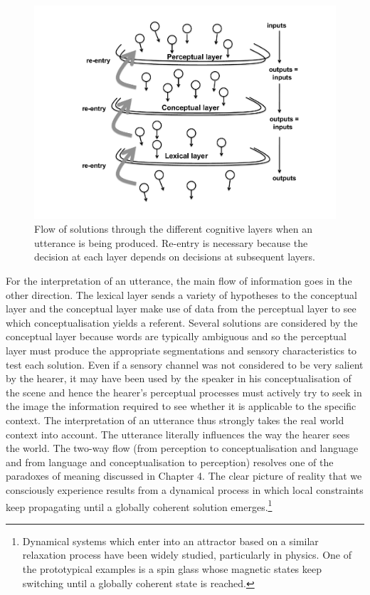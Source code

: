 \begin{figure}[htbp]
  \centerline{\includegraphics[width=.50\textwidth]{chap7/figs/sieve3.pdf}}
\caption{\label{sieve3}Flow of solutions through 
the different cognitive layers when an utterance is being produced.
Re-entry is necessary because the decision at each layer depends on
decisions at subsequent layers.} 
\end{figure}

For the interpretation of an utterance, the main 
flow of information goes in the other direction. The
lexical layer sends a variety of hypotheses to 
the conceptual layer and the conceptual layer make use of data 
from the perceptual layer to see which conceptualisation
yields a referent. Several solutions are considered 
by the conceptual layer because words are typically 
ambiguous and so the perceptual 
layer must produce the appropriate segmentations and 
sensory characteristics to test each solution.
Even if a sensory channel was not considered to be 
very salient by the hearer, it may have been 
used by the speaker in his conceptualisation of the 
scene and hence the hearer's perceptual 
processes must actively try to seek in the 
image the information required to see whether it 
is applicable to the specific
context. The interpretation of an utterance
thus strongly takes the real world context into account. 
The utterance literally influences the way the 
hearer sees the world. The two-way flow (from perception
to conceptualisation and language and from language
and conceptualisation to perception) resolves one of the 
paradoxes of meaning discussed in Chapter 4. The 
clear picture of reality that we consciously experience
results from a dynamical process in which local constraints 
keep propagating until a globally coherent solution
emerges.\footnote{Dynamical systems which enter into an attractor
based on a similar relaxation process have been 
widely studied, particularly in physics. One of the 
prototypical examples is a spin glass whose magnetic
states keep switching until a globally coherent
state is reached.}

